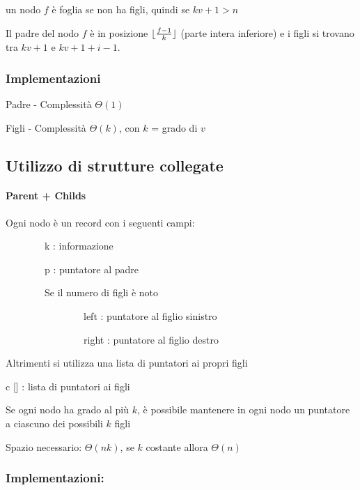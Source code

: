 \documentclass[11pt,a4paper,twoside,openright]{book}
\DeclarePairedDelimiter\floor{\lfloor}{\rfloor}
\let\oldparagraph\paragraph
\renewcommand{\paragraph}[1]{\oldparagraph{#1}\mbox{}}
\begin{document}
{{{un nodo $f$ è foglia se non ha figli, quindi se $kv+1>n$}

{Il padre del nodo $f$ è in posizione $\floor{\frac{f-1}{k}}$ (parte intera inferiore) e i figli si trovano tra $kv+1$ e $kv+1+i-1$.

\subsubsection{Implementazioni}

{Padre - Complessità $\Theta(1)$}



{Figli - Complessità $\Theta(k)$, con $k$ = grado di $v$}



\subsection{Utilizzo di strutture collegate}

\paragraph{Parent + Childs}

{}

{Ogni nodo è un record con i seguenti campi:}

{~~~~~~~~k : informazione}

{~~~~~~~~p : puntatore al padre}



{~~~~~~~~Se il numero di figli è noto}

{}

{~~~~~~~~~~~~~~~~left : puntatore al figlio sinistro}

{~~~~~~~~~~~~~~~~right : puntatore al figlio destro}

{}

{Altrimenti si utilizza una lista di puntatori ai propri figli}

{c {[}{]} : lista di puntatori ai figli~~~~~~~~}

{Se ogni nodo ha grado al più $k$, è possibile mantenere in ogni nodo un puntatore a ciascuno dei possibili $k$ figli}

{Spazio necessario: $\Theta(nk)$, se $k$ costante allora $\Theta(n)$}

\subsubsection{Implementazioni:}

}}}
\end{document}

